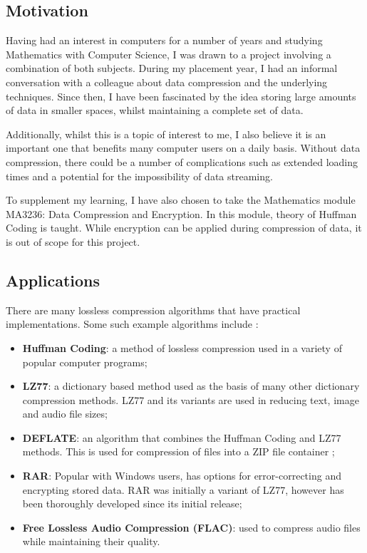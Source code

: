 \documentclass[12pt]{article}
\begin{document}
\subsection{Motivation}
Having had an interest in computers for a number of years and studying Mathematics with Computer Science, I was drawn to a project involving a combination of both subjects. During my placement year, I had an informal conversation with a colleague about data compression and the underlying techniques. Since then, I have been fascinated by the idea storing large amounts of data in smaller spaces, whilst maintaining a complete set of data.

Additionally, whilst this is a topic of interest to me, I also believe it is an important one that benefits many computer users on a daily basis. Without data compression, there could be a number of complications such as extended loading times and a potential for the impossibility of data streaming.

To supplement my learning, I have also chosen to take the Mathematics module MA3236: Data Compression and Encryption. In this module, theory of Huffman Coding is taught. While encryption can be applied during compression of data, it is out of scope for this project.

\subsection{Applications}
There are many lossless compression algorithms that have practical implementations. Some such example algorithms include \citep[p.~1050-1065]{dc_complete_ref}:

\begin{itemize}
	\item \textbf{Huffman Coding}: a method of lossless compression used in a variety of popular computer programs;
	
	\item \textbf{LZ77}: a dictionary based method used as the basis of many other dictionary compression methods. LZ77 and its variants are used in reducing text, image and audio file sizes;
	
	\item \textbf{DEFLATE}: an algorithm that combines the Huffman Coding and LZ77 methods. This is used for compression of files into a ZIP file container \citep{deflate_rfc};
	
	\item \textbf{RAR}: Popular with Windows users, has options for error-correcting and encrypting stored data. RAR was initially a variant of LZ77, however has been thoroughly developed since its initial release;
	
	\item \textbf{Free Lossless Audio Compression (FLAC)}: used to compress audio files while maintaining their quality.
	
\end{itemize}
\end{document}
